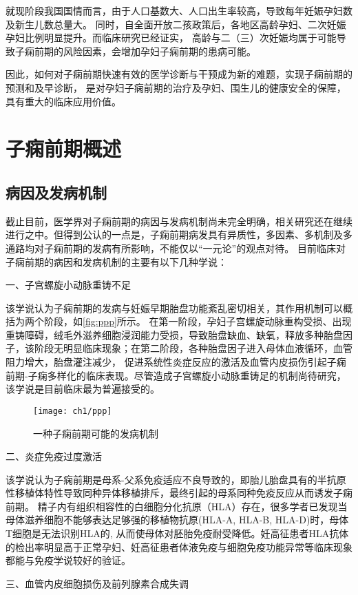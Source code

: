 就现阶段我国国情而言，由于人口基数大、人口出生率较高，导致每年妊娠孕妇数及新生儿数总量大。
同时，自全面开放二孩政策后，各地区高龄孕妇、二次妊娠孕妇比例明显提升。而临床研究已经证实，
高龄与二（三）次妊娠均属于可能导致子痫前期的风险因素，会增加孕妇子痫前期的患病可能。

因此，如何对子痫前期快速有效的医学诊断与干预成为新的难题，实现子痫前期的预测和及早诊断，
是对孕妇子痫前期的治疗及孕妇、围生儿的健康安全的保障，具有重大的临床应用价值。
\section{子痫前期概述}
\subsection{病因及发病机制}
截止目前，医学界对子痫前期的病因与发病机制尚未完全明确，相关研究还在继续进行之中。但得到公认的一点是，子痫前期病发具有异质性，多因素、多机制及多通路均对子痫前期的发病有所影响，不能仅以“一元论”的观点对待。
目前临床对子痫前期的病因和发病机制的主要有以下几种学说：

一、子宫螺旋小动脉重铸不足

该学说认为子痫前期的发病与妊娠早期胎盘功能紊乱密切相关\cite{OAG9,Duvekot2010}，其作用机制可以概括为两个阶段，如\autoref{fig:ppp}所示。
在第一阶段，孕妇子宫螺旋动脉重构受损、出现重铸障碍，绒毛外滋养细胞浸润能力受损，导致胎盘缺血、缺氧，释放多种胎盘因子，该阶段无明显临床现象；在第二阶段，各种胎盘因子进入母体血液循环，血管阻力增大，胎盘灌注减少，
促进系统性炎症反应的激活及血管内皮损伤引起子痫前期-子痫多样化的临床表现。尽管造成子宫螺旋小动脉重铸足的机制尚待研究，该学说是目前临床最为普遍接受的。
\begin{figure}[htbp]
    \centering
    \texttt{[image: ch1/ppp]}
    \caption{\label{fig:ppp}一种子痫前期可能的发病机制}
\end{figure}

二、炎症免疫过度激活

该学说认为子痫前期是母系-父系免疫适应不良导致的\cite{Sibai2005,OAG9,Shi2006}，即胎儿胎盘具有的半抗原性移植体特性导致同种异体移植排斥，最终引起的母系同种免疫反应从而诱发子痫前期。
精子内有组织相容性的白细胞分化抗原（HLA）存在，很多学者已发现当母体滋养细胞不能够表达足够强的移植物抗原(HLA-A, HLA-B, HLA-D)\cite{Moffett2002}时，母体T细胞是无法识别HLA的,
从而使母体对胚胎免疫耐受降低。妊高征患者HLA抗体的检出率明显高于正常孕妇、妊高征患者体液免疫与细胞免疫功能异常等临床现象都能与免疫学说较好的验证。

三、血管内皮细胞损伤及前列腺素合成失调

